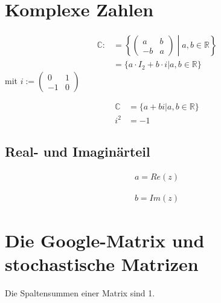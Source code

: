 \documentclass{scrartcl}
\begin{document}
\newpage
\section{Komplexe Zahlen}

\begin{Def}
    \begin{align*}
    \mathbb{C} :&= \left\{ \begin{pmatrix} a & b \\ -b & a \end{pmatrix} \middle| a,b \in \mathbb{R} \right\} \\
    &= \{ a \cdot I_2 + b \cdot i |a,b \in \mathbb{R} \}
    \end{align*}
    mit $i := \begin{pmatrix} 0 & 1 \\ -1 & 0 \end{pmatrix}$
\end{Def}

\begin{Def}
\begin{align*}
\mathbb{C} &= \{ a + bi | a,b \in \mathbb{R} \}\\
i^2 &= -1
\end{align*}
\end{Def}

\subsection{Real- und Imaginärteil}

\begin{Def}[Realteil]
    \begin{align*}
        a = Re(z)
    \end{align*}
\end{Def}

\begin{Def}[Imaginärteil]
    \begin{align*}
        b = Im(z)
    \end{align*}
\end{Def}

\newpage
\section{Die Google-Matrix und stochastische Matrizen}

\begin{Def}
Die Spaltensummen einer Matrix sind 1.
\end{Def}
\end{document}
